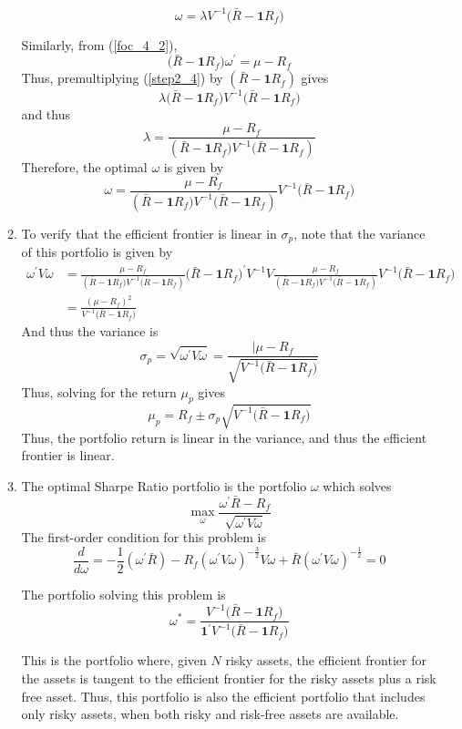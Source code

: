 \documentclass[11pt]{article}
\newcommand{\w}{\omega}
\newcommand{\p}{\prime}
\newcommand{\one}{\mathbf{1}}
\newcommand{\onep}{\mathbf{1}^\prime}
\newcommand{\inv}[1]{#1^{-1}}
\renewcommand{\wp}{\omega^\prime}
\begin{document}
\begin{enumerate}
\begin{enumerate}
		\begin{equation}\label{step2_4}
		\w = \lambda \inv{V} \big(\bar{R} - \one R_f\big)
		\end{equation}
		
		Similarly, from (\ref{foc_4_2}), 
		\[\big(\bar{R} - \one R_f\big)\wp = \mu - R_f\]
		Thus, premultiplying (\ref{step2_4}) by $ (\bar{R} - \one R_f) $ gives
		\[\lambda\big(\bar{R} - \one R_f\big) \inv{V} \big(\bar{R} - \one R_f\big)\]
		and thus
		\[\lambda = \frac{\mu - R_f}{(\bar{R} - \one R_f\big) \inv{V} \big(\bar{R} - \one R_f )}\]
		Therefore, the optimal $ \w $ is given by 
		\[\w = \frac{\mu - R_f}{(\bar{R} - \one R_f\big) \inv{V} \big(\bar{R} - \one R_f )} \inv{V} \big(\bar{R} - \one R_f\big) \]
		
		\item To verify that the efficient frontier is linear in $ \sigma_p $, note that the variance of this portfolio is given by 
		\begin{align*}
		\wp V\w &= \frac{\mu - R_f}{(\bar{R} - \one R_f\big) \inv{V} \big(\bar{R} - \one R_f )} \big(\bar{R} - \one R_f\big)^\p \inv{V} V \frac{\mu - R_f}{(\bar{R} - \one R_f\big) \inv{V} \big(\bar{R} - \one R_f )} \inv{V} \big(\bar{R} - \one R_f\big) \\
		&= \frac{(\mu - R_f)^2}{\inv{V} \big(\bar{R} - \one R_f\big)}
		\end{align*}
		And thus the variance is 
		\[\sigma_p = \sqrt{\wp V \w} = \frac{|\mu - R_f}{\sqrt{\inv{V} \big(\bar{R} - \one R_f\big)}}\]
		Thus, solving for the return $ \mu_p $ gives
		\[\mu_p = R_f \pm \sigma_p \sqrt{\inv{V} \big(\bar{R} - \one R_f\big)}\]
		Thus, the portfolio return is linear in the variance, and thus the efficient frontier is linear. 
		
		\item The optimal Sharpe Ratio portfolio is the portfolio $ \w $ which solves
		\[\max_\w \frac{\wp\bar{R} - R_f}{\sqrt{\wp V \w}}\]
		The first-order condition for this problem is 
		\[\frac{d}{d\w} = -\frac{1}{2}(\wp \bar{R}) - R_f (\wp V \w)^{-\frac{3}{2}} V\w + \bar{R}(\wp V \w)^{-\frac{1}{2}} = 0 \]
		
		The portfolio solving this problem is 
		\[\w^* = \frac{\inv{V}\big(\bar{R} - \one R_f\big)}{\onep \inv{V} \big(\bar{R} - \one R_f\big)} \]
		
		This is the portfolio where, given $ N $ risky assets, the efficient frontier for the assets is tangent to the efficient frontier for the risky assets plus a risk free asset. Thus, this portfolio is also the efficient portfolio that includes only risky assets, when both risky and risk-free assets are available. 
	\end{enumerate}


\end{enumerate}
\end{document}

